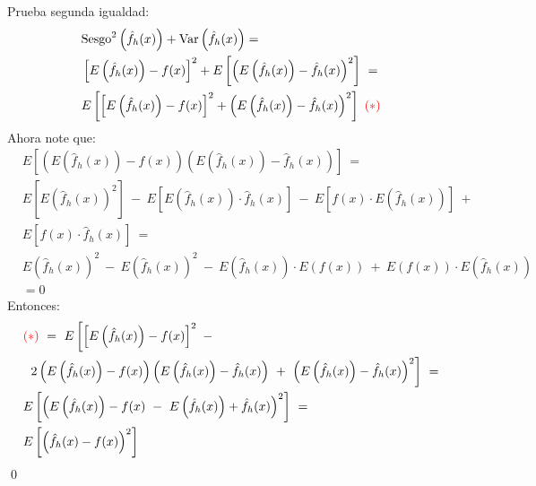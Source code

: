 \documentclass[
  12pt,
]{book}
\theoremstyle{definition}
\theoremstyle{definition}
\theoremstyle{definition}
\theoremstyle{remark}
\let\BeginKnitrBlock\begin \let\EndKnitrBlock\end
\begin{document}
\BeginKnitrBlock{solution}
{}Prueba segunda igualdad:
\begin{align*}
& \text{Sesgo}^2\left(\hat{f}_h(x)  \right) + \text{Var}\left( \hat{f}_h(x)\right)  = \\ & \left[ E\left(\hat{f}_h(x)\right) - f(x)\right]^2 + E\left[\left( E\left(\hat{f}_h(x)\right) - \hat{f}_h(x)\right)^2\right] \ =
\\ & E\left[\left[ E\left(\hat{f}_h(x)\right) - f(x)\right]^2 + \left( E\left(\hat{f}_h(x)\right) - \hat{f}_h(x)\right)^2   \right] \ \textcolor{red}{(*)} \
\end{align*}
Ahora note que:
\begin{align*}
& E\left[\left( E\left(\hat{f}_h(x)\right) - f(x)   \right) \left(E\left(\hat{f}_h(x)\right) - \hat{f}_h(x)    \right)    \right] \ = \                                      \\
& E\left[E\left(\hat{f}_h(x)\right)^2 \right] \ - \ E\left[E\left(\hat{f}_h(x)\right)\cdot \hat{f}_h(x) \right] \ - \ E\left[f(x)\cdot E\left(\hat{f}_h(x)\right)\right] \ + \\
& E\left[f(x)\cdot \hat{f}_h(x)\right]\ = \                                                                                                                                  \\
& E\left(\hat{f}_h(x)\right)^2  \ - \ E\left(\hat{f}_h(x)\right)^2  \ - \ E\left(\hat{f}_h(x)\right)\cdot E\left( f(x)\right) \ + \
E\left( f(x)\right)\cdot E\left(\hat{f}_h(x)\right) \                                                                                                                         \\
& = 0
\end{align*}
Entonces:
\begin{align*}
& \textcolor{red}{(*)} \ = \ E\left[\left[ E\left(\hat{f}_h(x)\right) - f(x)\right]^2 \ -  \right.                                                                                                         \\
& \left. \ 2\left( E\left(\hat{f}_h(x)\right) - f(x)   \right) \left(E\left(\hat{f}_h(x)\right) - \hat{f}_h(x)    \right) \ + \ \left( E\left(\hat{f}_h(x)\right) - \hat{f}_h(x)\right)^2   \right] \ = \  \\
& E\left[ \left(E\left(\hat{f}_h(x)\right) - f(x) \ - \ E\left(\hat{f}_h(x)\right) + \hat{f}_h(x) \right)^2   \right] \ = \                                                                                \\
& E\left[\left(\hat{f}_h(x) - f(x)\right)^2    \right]
\end{align*}
\qed
\EndKnitrBlock{solution}
\end{document}
